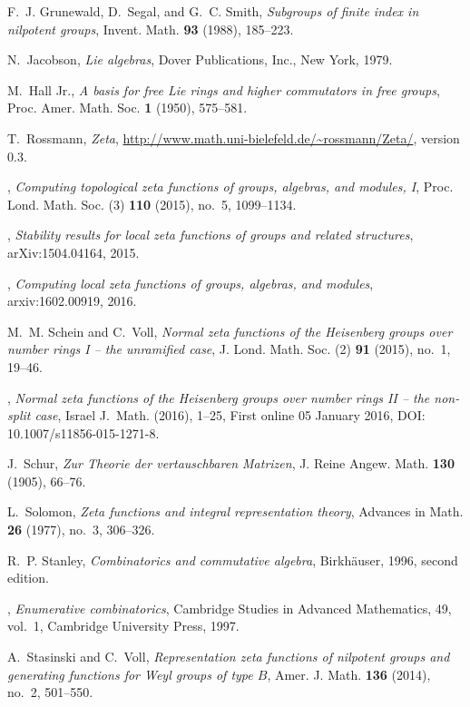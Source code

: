 \documentclass[11pt]{amsart}
\numberwithin{equation}{section}
\numberwithin{figure}{section}
\theoremstyle{plain}
\theoremstyle{definition}
\theoremstyle{remark}
\begin{document}
\begin{thebibliography}{10}
F.~J. Grunewald, D.~Segal, and G.~C. Smith, \emph{Subgroups of finite index in
  nilpotent groups}, Invent. Math. \textbf{93} (1988), 185--223.

N.~Jacobson, \emph{Lie algebras}, Dover Publications, Inc., New York, 1979.

M.~Hall Jr., \emph{A basis for free {L}ie rings and higher commutators in free
  groups}, Proc. Amer. Math. Soc. \textbf{1} (1950), 575--581.

T.~Rossmann, \emph{{Zeta}},
  \url{http://www.math.uni-bielefeld.de/~rossmann/Zeta/}, version 0.3.

\bysame, \emph{Computing topological zeta functions of groups, algebras, and
  modules, {I}}, Proc. Lond. Math. Soc. (3) \textbf{110} (2015), no.~5,
  1099--1134.

\bysame, \emph{Stability results for local zeta functions of groups and related
  structures}, arXiv:1504.04164, 2015.

\bysame, \emph{Computing local zeta functions of groups, algebras, and
  modules}, arxiv:1602.00919, 2016.

M.~M. Schein and C.~Voll, \emph{{Normal zeta functions of the Heisenberg groups
  over number rings I -- the unramified case}}, J. Lond. Math. Soc. (2)
  \textbf{91} (2015), no.~1, 19--46.

\bysame, \emph{{Normal zeta functions of the Heisenberg groups over number
  rings II -- the non-split case}}, Israel J.\ Math. (2016), 1--25, First
  online 05 January 2016, DOI: 10.1007/s11856-015-1271-8.

J.~Schur, \emph{Zur {T}heorie der vertauschbaren {M}atrizen}, J. Reine Angew.
  Math. \textbf{130} (1905), 66--76.

L.~Solomon, \emph{Zeta functions and integral representation theory}, Advances
  in Math. \textbf{26} (1977), no.~3, 306--326.

R.~P. Stanley, \emph{Combinatorics and commutative algebra}, Birkh\"{a}user,
  1996, second edition.

\bysame, \emph{Enumerative combinatorics}, Cambridge Studies in Advanced
  Mathematics, 49, vol.~1, Cambridge University Press, 1997.

A.~Stasinski and C.~Voll, \emph{{Representation zeta functions of nilpotent
  groups and generating functions for Weyl groups of type $B$}}, Amer. J. Math.
  \textbf{136} (2014), no.~2, 501--550.


\end{thebibliography}
\end{document}
